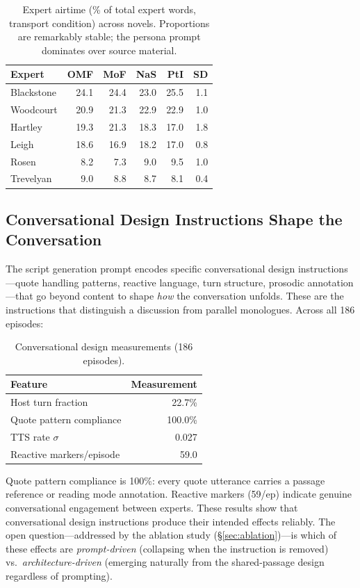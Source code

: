 \documentclass[final]{clv2025}
\begin{document}
\begin{table}[t]
\caption{Expert airtime (\% of total expert words, transport condition)
  across novels.  Proportions are remarkably stable; the persona prompt
  dominates over source material.}
\label{tab:xnovel-airtime}
\begin{tabular}{lrrrrr}
\toprule
Expert & OMF & MoF & NaS & PtI & SD \\
\midrule
Blackstone & 24.1 & 24.4 & 23.0 & 25.5 & 1.1 \\
Woodcourt  & 20.9 & 21.3 & 22.9 & 22.9 & 1.0 \\
Hartley    & 19.3 & 21.3 & 18.3 & 17.0 & 1.8 \\
Leigh      & 18.6 & 16.9 & 18.2 & 17.0 & 0.8 \\
Rosen      &  8.2 &  7.3 &  9.0 &  9.5 & 1.0 \\
Trevelyan  &  9.0 &  8.8 &  8.7 &  8.1 & 0.4 \\
\bottomrule
\end{tabular}
\end{table}


\subsection{Conversational Design Instructions Shape the Conversation}
\label{sec:conversational}

The script generation prompt encodes specific conversational design
instructions---quote handling patterns, reactive language, turn
structure, prosodic annotation---that go beyond content to shape
\emph{how} the conversation unfolds.  These are the instructions that
distinguish a discussion from parallel monologues.  Across all 186
episodes:

\begin{table}[t]
\caption{Conversational design measurements (186 episodes).}
\label{tab:conversational}
\begin{tabular}{lr}
\toprule
Feature & Measurement \\
\midrule
Host turn fraction & 22.7\% \\
Quote pattern compliance & 100.0\% \\
TTS rate $\sigma$ & 0.027 \\
Reactive markers/episode & 59.0 \\
\bottomrule
\end{tabular}
\end{table}

Quote pattern compliance is 100\%: every quote utterance carries a
passage reference or reading mode annotation.  Reactive markers (59/ep)
indicate genuine conversational engagement between experts.  These
results show that conversational design instructions produce their
intended effects reliably.  The open question---addressed by the
ablation study (\S\ref{sec:ablation})---is which of these effects are
\emph{prompt-driven} (collapsing when the instruction is removed) vs.\
\emph{architecture-driven} (emerging naturally from the shared-passage
design regardless of prompting).
\end{document}
